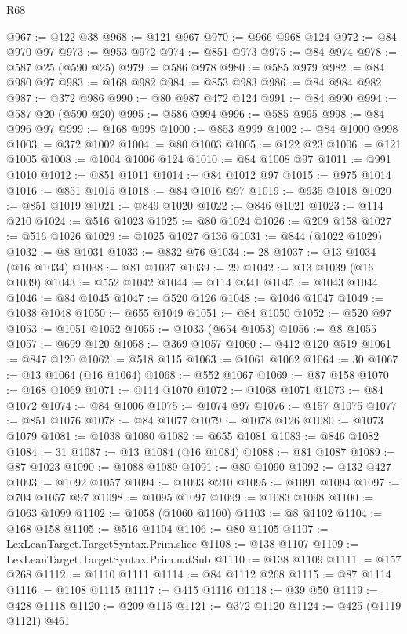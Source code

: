 \begin{lexlean}{R68}
\begin{coremodule}
@967 := @122 @38
@968 := @121 @967
@970 := @966 @968 @124
@972 := @84 @970 @97
@973 := @953 @972
@974 := @851 @973
@975 := @84 @974
@978 := @587 @25 (@590 @25)
@979 := @586 @978
@980 := @585 @979
@982 := @84 @980 @97
@983 := @168 @982
@984 := @853 @983
@986 := @84 @984 @982
@987 := @372 @986
@990 := @80 @987 @472 @124
@991 := @84 @990
@994 := @587 @20 (@590 @20)
@995 := @586 @994
@996 := @585 @995
@998 := @84 @996 @97
@999 := @168 @998
@1000 := @853 @999
@1002 := @84 @1000 @998
@1003 := @372 @1002
@1004 := @80 @1003
@1005 := @122 @23
@1006 := @121 @1005
@1008 := @1004 @1006 @124
@1010 := @84 @1008 @97
@1011 := @991 @1010
@1012 := @851 @1011
@1014 := @84 @1012 @97
@1015 := @975 @1014
@1016 := @851 @1015
@1018 := @84 @1016 @97
@1019 := @935 @1018
@1020 := @851 @1019
@1021 := @849 @1020
@1022 := @846 @1021
@1023 := @114 @210
@1024 := @516 @1023
@1025 := @80 @1024
@1026 := @209 @158
@1027 := @516 @1026
@1029 := @1025 @1027 @136
@1031 := @844 (@1022 @1029)
@1032 := @8 @1031
@1033 := @832 @76
@1034 := 28
@1037 := @13 @1034 (@16 @1034)
@1038 := @81 @1037
@1039 := 29
@1042 := @13 @1039 (@16 @1039)
@1043 := @552 @1042
@1044 := @114 @341
@1045 := @1043 @1044
@1046 := @84 @1045
@1047 := @520 @126
@1048 := @1046 @1047
@1049 := @1038 @1048
@1050 := @655 @1049
@1051 := @84 @1050
@1052 := @520 @97
@1053 := @1051 @1052
@1055 := @1033 (@654 @1053)
@1056 := @8 @1055
@1057 := @699 @120
@1058 := @369 @1057
@1060 := @412 @120 @519
@1061 := @847 @120
@1062 := @518 @115
@1063 := @1061 @1062
@1064 := 30
@1067 := @13 @1064 (@16 @1064)
@1068 := @552 @1067
@1069 := @87 @158
@1070 := @168 @1069
@1071 := @114 @1070
@1072 := @1068 @1071
@1073 := @84 @1072
@1074 := @84 @1006
@1075 := @1074 @97
@1076 := @157 @1075
@1077 := @851 @1076
@1078 := @84 @1077
@1079 := @1078 @126
@1080 := @1073 @1079
@1081 := @1038 @1080
@1082 := @655 @1081
@1083 := @846 @1082
@1084 := 31
@1087 := @13 @1084 (@16 @1084)
@1088 := @81 @1087
@1089 := @87 @1023
@1090 := @1088 @1089
@1091 := @80 @1090
@1092 := @132 @427
@1093 := @1092 @1057
@1094 := @1093 @210
@1095 := @1091 @1094
@1097 := @704 @1057 @97
@1098 := @1095 @1097
@1099 := @1083 @1098
@1100 := @1063 @1099
@1102 := @1058 (@1060 @1100)
@1103 := @8 @1102
@1104 := @168 @158
@1105 := @516 @1104
@1106 := @80 @1105
@1107 := LexLeanTarget.TargetSyntax.Prim.slice
@1108 := @138 @1107
@1109 := LexLeanTarget.TargetSyntax.Prim.natSub
@1110 := @138 @1109
@1111 := @157 @268
@1112 := @1110 @1111
@1114 := @84 @1112 @268
@1115 := @87 @1114
@1116 := @1108 @1115
@1117 := @415 @1116
@1118 := @39 @50
@1119 := @428 @1118
@1120 := @209 @115
@1121 := @372 @1120
@1124 := @425 (@1119 @1121) @461

\end{coremodule}
\end{lexlean}
